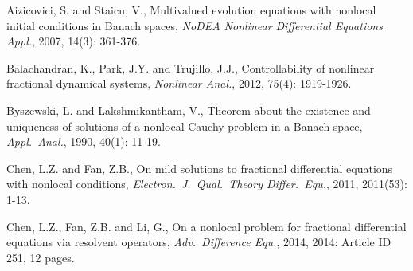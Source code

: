 \documentclass{PiMart}    %
\begin{document}
\BeginRef
\bibitem{[1]} Aizicovici, S. and  Staicu,  V.,  Multivalued evolution equations with nonlocal initial conditions in Banach spaces,
{\it NoDEA Nonlinear Differential Equations Appl.}, 2007, 14(3): 361-376.

\bibitem{[2]} Balachandran, K., Park, J.Y. and  Trujillo, J.J.,  Controllability of nonlinear fractional dynamical systems, {\it Nonlinear Anal.}, 2012, 75(4): 1919-1926.

\bibitem{[3]} Byszewski, L. and  Lakshmikantham, V.,  Theorem about the existence and uniqueness of solutions of a nonlocal Cauchy problem in a Banach space, {\it Appl.\ Anal.}, 1990, 40(1): 11-19.

\bibitem{[4]} Chen, L.Z. and Fan, Z.B.,  On mild solutions to fractional differential equations with nonlocal conditions, {\it Electron.\ J.\ Qual.\ Theory Differ.\ Equ.}, 2011, 2011(53): 1-13.

\bibitem{[5]} Chen, L.Z., Fan, Z.B. and Li, G., On a nonlocal problem for fractional differential equations via resolvent operators,  {\it Adv.\ Difference Equ.},  2014, 2014: Article ID 251, 12 pages.

\EndRef
\end{document}
